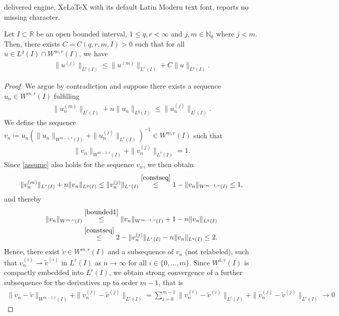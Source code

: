 \documentclass[10pt,a4paper]{amsart}
\def\N{{\mathbb N}} \def\bbO{{\mathbb O}}
\newcommand{\R}{\mathbb{R}}
\newcommand{\tilv}{\tilde{v}}
\begin{document}
delivered engine, XeLaTeX with its default Latin Modern text font, reports no missing character.
\begin{lemma} \label{IntLemAbstr}
Let $I \subset \R$ be an open bounded interval, $1 \leq q,r < \infty$ and $j,m \in \N_0$ where $j<m$. Then, there exists $C=C(q,r,m,I)>0$ such that for all $u \in L^q(I) \cap W^{m,r}(I)$, we have
\begin{align} \label{eq:IntLemAbstr}
    \|u^{(j)}\|_{L^r(I)} \leq \|u^{(m)}\|_{L^r(I)} + C\|u\|_{L^q(I)}.
\end{align}
\end{lemma}

\begin{proof}
We argue by contradiction and suppose there exists a sequence $u_n \in W^{m,r}(I)$ fulfilling
    \begin{align} \label{assume}
        \|u_n^{(m)}\|_{L^r(I)} + n\|u_n\|_{L^q(I)} \leq \|u_n^{(j)}\|_{L^r(I)}.
    \end{align}
We define the sequence $v_n \coloneq u_n \left(\|u_n\|_{W^{m-1,r}(I)}+\|u_n^{(j)}\|_{L^r(I)}\right)^{-1} \in W^{m,r}(I)$ such that
\begin{align} \label{constseq}
    \|v_n\|_{W^{m-1,r}(I)}+\|v_n^{(j)}\|_{L^r(I)}=1.
\end{align}
Since \eqref{assume} also holds for the sequence $v_n$, we then obtain
\begin{align} \label{bounded1}
    \|v_n^{(m)}\|_{L^r(I)}+n\|v_n\|_{L^q(I)} 
    \leq \|v_n^{(j)}\|_{L^r(I)}
    \overset{\eqref{constseq}}{\leq} 1-\|v_n\|_{W^{m-1,r}(I)} \leq 1,
\end{align}
and thereby
\begin{align} \label{bounded2}
\begin{split}
    \|v_n\|_{W^{m,r}(I)} & \overset{\eqref{bounded1}}{\leq}  \|v_n\|_{W^{m-1,r}(I)} +1 - n \|v_n\|_{L^q(I)}\\
    &\overset{\eqref{constseq}}{\leq} 2- \|v_n^{(j)}\|_{L^r(I)} - n \|v_n\|_{L^q(I)}
    \leq 2.
\end{split}
\end{align}
Hence, there exist $\tilv \in W^{m,r}(I)$ and a subsequence of $v_n$ (not relabeled), such that $v_n^{(i)} \rightharpoonup \tilv^{(i)}$ in $L^r(I)$ as $n \to \infty$ for all $i \in \{0,\ldots , m\}$. Since $W^{1,r}(I)$ is compactly embedded into $L^r(I)$, we obtain strong convergence of a further subsequence for the derivatives up to order $m-1$, that is
\begin{align}
    \|v_n-\tilv \|_{W^{m-1,r}(I)}+ \|v_n^{(j)}- \tilv^{(j)}\|_{L^r(I)} = \sum_{i=0}^{m-1} \|v_n^{(i)}- \tilv^{(i)}\|_{L^r(I)} +\|v_n^{(j)}- \tilv^{(j)}\|_{L^r(I)} \to 0

\end{align}
\end{proof}
\end{document}
